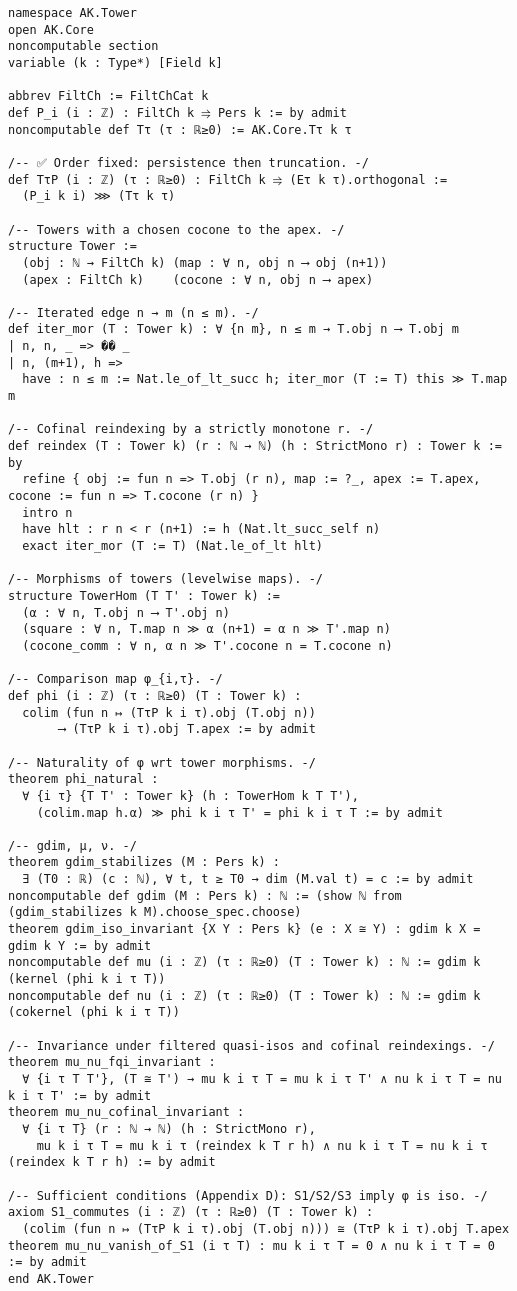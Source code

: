 \documentclass[11pt]{article}
\numberwithin{equation}{section}
\theoremstyle{plain}
\theoremstyle{definition}
\theoremstyle{remark}
\theoremstyle{plain}
\theoremstyle{definition}
\numberwithin{equation}{section}
\theoremstyle{definition}
\numberwithin{equation}{section}
\theoremstyle{plain}
\theoremstyle{definition}
\theoremstyle{remark}
\begin{document}
\begin{verbatim}
namespace AK.Tower
open AK.Core
noncomputable section
variable (k : Type*) [Field k]

abbrev FiltCh := FiltChCat k
def P_i (i : ℤ) : FiltCh k ⥤ Pers k := by admit
noncomputable def Tτ (τ : ℝ≥0) := AK.Core.Tτ k τ

/-- ✅ Order fixed: persistence then truncation. -/
def TτP (i : ℤ) (τ : ℝ≥0) : FiltCh k ⥤ (Eτ k τ).orthogonal :=
  (P_i k i) ⋙ (Tτ k τ)

/-- Towers with a chosen cocone to the apex. -/
structure Tower :=
  (obj : ℕ → FiltCh k) (map : ∀ n, obj n ⟶ obj (n+1))
  (apex : FiltCh k)    (cocone : ∀ n, obj n ⟶ apex)

/-- Iterated edge n → m (n ≤ m). -/
def iter_mor (T : Tower k) : ∀ {n m}, n ≤ m → T.obj n ⟶ T.obj m
| n, n, _ => �� _
| n, (m+1), h =>
  have : n ≤ m := Nat.le_of_lt_succ h; iter_mor (T := T) this ≫ T.map m

/-- Cofinal reindexing by a strictly monotone r. -/
def reindex (T : Tower k) (r : ℕ → ℕ) (h : StrictMono r) : Tower k := by
  refine { obj := fun n => T.obj (r n), map := ?_, apex := T.apex, cocone := fun n => T.cocone (r n) }
  intro n
  have hlt : r n < r (n+1) := h (Nat.lt_succ_self n)
  exact iter_mor (T := T) (Nat.le_of_lt hlt)

/-- Morphisms of towers (levelwise maps). -/
structure TowerHom (T T' : Tower k) :=
  (α : ∀ n, T.obj n ⟶ T'.obj n)
  (square : ∀ n, T.map n ≫ α (n+1) = α n ≫ T'.map n)
  (cocone_comm : ∀ n, α n ≫ T'.cocone n = T.cocone n)

/-- Comparison map φ_{i,τ}. -/
def phi (i : ℤ) (τ : ℝ≥0) (T : Tower k) :
  colim (fun n ↦ (TτP k i τ).obj (T.obj n))
       ⟶ (TτP k i τ).obj T.apex := by admit

/-- Naturality of φ wrt tower morphisms. -/
theorem phi_natural :
  ∀ {i τ} {T T' : Tower k} (h : TowerHom k T T'),
    (colim.map h.α) ≫ phi k i τ T' = phi k i τ T := by admit

/-- gdim, μ, ν. -/
theorem gdim_stabilizes (M : Pers k) :
  ∃ (T0 : ℝ) (c : ℕ), ∀ t, t ≥ T0 → dim (M.val t) = c := by admit
noncomputable def gdim (M : Pers k) : ℕ := (show ℕ from (gdim_stabilizes k M).choose_spec.choose)
theorem gdim_iso_invariant {X Y : Pers k} (e : X ≅ Y) : gdim k X = gdim k Y := by admit
noncomputable def mu (i : ℤ) (τ : ℝ≥0) (T : Tower k) : ℕ := gdim k (kernel (phi k i τ T))
noncomputable def nu (i : ℤ) (τ : ℝ≥0) (T : Tower k) : ℕ := gdim k (cokernel (phi k i τ T))

/-- Invariance under filtered quasi-isos and cofinal reindexings. -/
theorem mu_nu_fqi_invariant :
  ∀ {i τ T T'}, (T ≅ T') → mu k i τ T = mu k i τ T' ∧ nu k i τ T = nu k i τ T' := by admit
theorem mu_nu_cofinal_invariant :
  ∀ {i τ T} (r : ℕ → ℕ) (h : StrictMono r),
    mu k i τ T = mu k i τ (reindex k T r h) ∧ nu k i τ T = nu k i τ (reindex k T r h) := by admit

/-- Sufficient conditions (Appendix D): S1/S2/S3 imply φ is iso. -/
axiom S1_commutes (i : ℤ) (τ : ℝ≥0) (T : Tower k) :
  (colim (fun n ↦ (TτP k i τ).obj (T.obj n))) ≅ (TτP k i τ).obj T.apex
theorem mu_nu_vanish_of_S1 (i τ T) : mu k i τ T = 0 ∧ nu k i τ T = 0 := by admit
end AK.Tower
\end{verbatim}
\end{document}
